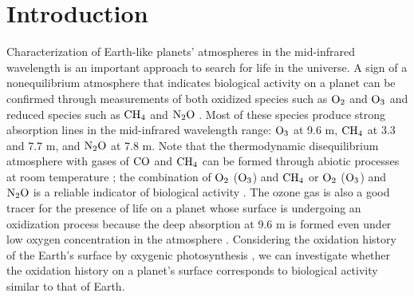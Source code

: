 \documentclass{aastex62}
\begin{document}


\section{Introduction} \label{sec:intro}

Characterization of Earth-like planets' atmospheres in the mid-infrared wavelength is an important approach to search for life in the universe. A sign of a nonequilibrium atmosphere that indicates biological activity on a planet can be confirmed through measurements of both oxidized species such as $\rm O_2$ and $\rm O_3$ and reduced species such as $\rm CH_4$ and $\rm N_{2}O$ \citep{1965Natur.207..568L, 1993Natur.365..715S}. Most of these species produce strong absorption lines in the mid-infrared wavelength range: $\rm O_3$ at 9.6 \textmu m, $\rm CH_4$ at 3.3 and 7.7 \textmu m, and $\rm N_{2}O$ at 7.8 \textmu m. Note that the thermodynamic disequilibrium atmosphere with gases of $\rm CO$ and $\rm CH_4$ can be formed through abiotic processes at room temperature \citep{2014PNAS..11112641K}; the combination of $\rm O_2$ ($\rm O_3$) and $\rm CH_4$ or $\rm O_2$ ($\rm O_3$) and $\rm N_{2}O$ is a reliable indicator of biological activity \citep[e.g.,][]{2017ARA&A..55..433K}. The ozone gas is also a good tracer for the presence of life on a planet whose surface is undergoing an oxidization process because the deep absorption at 9.6 \textmu m is formed even under low oxygen concentration in the atmosphere \citep{2018ApJ...854...19R}. Considering the oxidation history of the Earth's surface by oxygenic photosynthesis \citep[e.g.,][]{2007Natur.448..1033, 2014Natur.506..307L}, we can investigate whether the oxidation history on a planet’s surface corresponds to biological activity similar to that of Earth.
\end{document}
